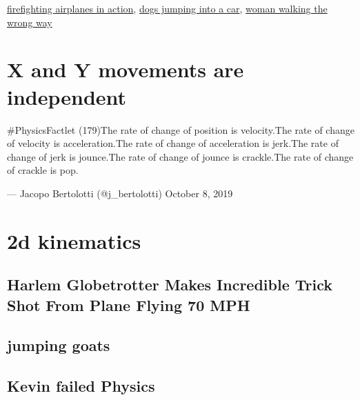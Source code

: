 \documentclass[
  letterpaper,
  DIV=11,
  numbers=noendperiod]{scrreprt}
\begin{document}

\href{https://youtu.be/aFzyqFrUUFc?t=105}{firefighting airplanes in
action},
\href{https://giphy.com/gifs/cute-aww-eyebleach-OOTtmh8oXrFK5ccNU7}{dogs
jumping into a car},
\href{https://www.youtube.com/watch?v=LcCA5z-I_iU}{woman walking the
wrong way}

\section*{X and Y movements are
independent}\label{x-and-y-movements-are-independent}


\#PhysicsFactlet (179)The rate of change of position is velocity.The
rate of change of velocity is acceleration.The rate of change of
acceleration is jerk.The rate of change of jerk is jounce.The rate of
change of jounce is crackle.The rate of change of crackle is pop.

--- Jacopo Bertolotti (@j\_bertolotti) October 8, 2019

\section*{2d kinematics}\label{d-kinematics}


\subsection*{Harlem Globetrotter Makes Incredible Trick Shot From Plane
Flying 70
MPH}\label{harlem-globetrotter-makes-incredible-trick-shot-from-plane-flying-70-mph}

\subsection*{jumping goats}\label{jumping-goats}

\subsection*{Kevin failed Physics}\label{kevin-failed-physics}
\end{document}
